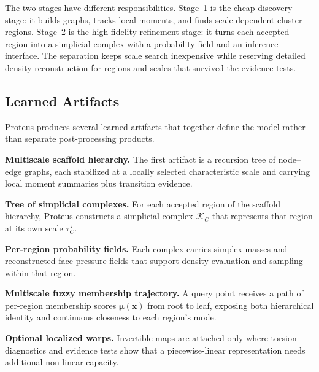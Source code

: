 \documentclass[11pt]{article}
\theoremstyle{definition}
\theoremstyle{plain}
\begin{document}
The two stages have different responsibilities. Stage~1 is the cheap discovery stage: it builds graphs, tracks local moments, and finds scale-dependent cluster regions. Stage~2 is the high-fidelity refinement stage: it turns each accepted region into a simplicial complex with a probability field and an inference interface. The separation keeps scale search inexpensive while reserving detailed density reconstruction for regions and scales that survived the evidence tests.

\subsection{Learned Artifacts}
Proteus produces several learned artifacts that together define the model rather than separate post-processing products.

\medskip

\textbf{Multiscale scaffold hierarchy.}
The first artifact is a recursion tree of node--edge graphs, each stabilized at a locally selected characteristic scale and carrying local moment summaries plus transition evidence.

\medskip

\textbf{Tree of simplicial complexes.}
For each accepted region of the scaffold hierarchy, Proteus constructs a simplicial complex $\mathcal K_C$ that represents that region at its own scale $\tau_C^\star$.

\medskip

\textbf{Per-region probability fields.}
Each complex carries simplex masses and reconstructed face-pressure fields that support density evaluation and sampling within that region.

\medskip

\textbf{Multiscale fuzzy membership trajectory.}
A query point receives a path of per-region membership scores $\boldsymbol\mu(\mathbf x)$ from root to leaf, exposing both hierarchical identity and continuous closeness to each region's mode.

\medskip

\textbf{Optional localized warps.}
Invertible maps are attached only where torsion diagnostics and evidence tests show that a piecewise-linear representation needs additional non-linear capacity.
\end{document}
